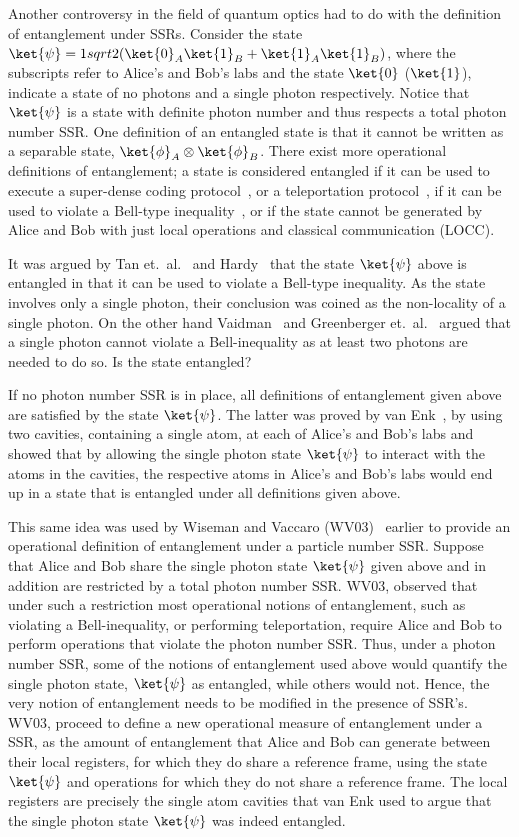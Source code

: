 Another controversy in the field of quantum optics had to do with the definition of entanglement under SSRs.  Consider the state $\ket{\psi}=1\/sqrt{2}(\ket{0}_A\ket{1}_B+\ket{1}_A\ket{1}_B)$, where the subscripts refer to Alice's and Bob's labs and the state $\ket{0}$ ($\ket{1}$), indicate a state of no photons and a single photon respectively.  Notice that $\ket{\psi}$ is a state with definite photon number and thus respects a total photon number SSR.  One definition of an entangled state is that it cannot be written as a separable state, $\ket{\phi}_A\otimes\ket{\phi}_B$.  There exist more operational definitions of entanglement;  a state is considered entangled if it can be used to execute a super-dense coding protocol~\cite{BW92}, or a teleportation protocol~\cite{BBCJPW93}, if it can be used to violate a Bell-type inequality~\cite{CHSH69}, or if the state cannot be generated by Alice and Bob with just local operations and classical communication (LOCC).  

It was argued by Tan et.~al.~\cite{TWC91} and Hardy~\cite{H94,H95} that the state $\ket{\psi}$ above is entangled in that it can be used to violate a Bell-type inequality.  As the state involves only a single photon, their conclusion was coined as the non-locality of a single photon. On the other hand Vaidman~\cite{V95} and Greenberger et.~al.~\cite{GHZ95} argued that a single photon cannot violate a Bell-inequality as at least two photons are needed to do so.  Is the state entangled? 

If no photon number SSR is in place, all definitions of entanglement given above are satisfied by the state $\ket{\psi}$. The latter was proved by van Enk~\cite{vE05a}, by using two cavities, containing a single atom, at each of Alice's and Bob's labs and showed that by allowing the single photon state $\ket{\psi}$ to interact with the atoms in the cavities, the respective atoms in Alice's and Bob's labs would end up in a state that is entangled under all definitions given above.  

This same idea was used by Wiseman and Vaccaro (WV03)~\cite{WV03} earlier to provide an operational definition of entanglement under a particle number SSR.  Suppose that Alice and Bob share the single photon state $\ket{\psi}$ given above and in addition are restricted by a total photon number SSR.  WV03, observed that under such a restriction most operational notions of entanglement, such as violating a Bell-inequality, or performing teleportation, require Alice and Bob to perform operations that violate the photon number SSR.  Thus, under a photon number SSR, some of the notions of entanglement used above would quantify the single photon state, $\ket{\psi}$ as entangled, while others would not.  Hence, the very notion of entanglement needs to be modified in the presence of SSR's.  WV03, proceed to define a new operational measure of entanglement under a SSR, as the amount of entanglement that Alice and Bob can generate between their local registers, for which they do share a reference frame, using the state $\ket{\psi}$ and operations for which they do not share a reference frame.  The local registers are precisely the single atom cavities that van Enk used to argue that the single photon state $\ket{\psi}$ was indeed entangled. 

